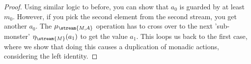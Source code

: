 \begin{proof}
Using similar logic to before, you can show that $a_0$ is guarded by at least $m_0$. However, if you pick the second element from the second stream, you get another $a_0$. The $\mu_{\stream{M,A}}$ operation has to cross over to the next 'sub-monster' $\eta_{\stream{M}}(a_1)$ to get the value $a_1$. This loops us back to the first case, where we show that doing this causes a duplication of monadic actions, considering the left identity. 

\end{proof}